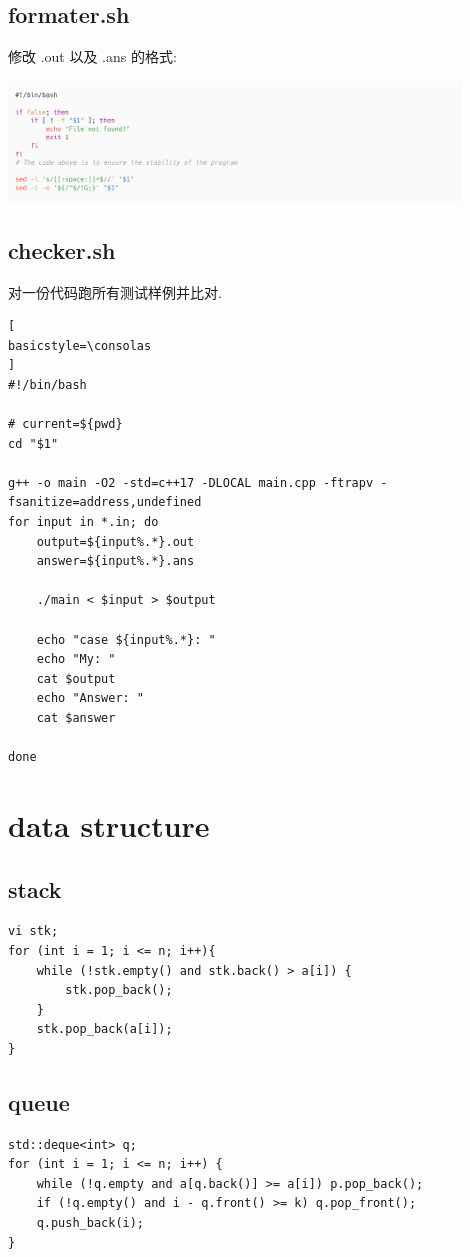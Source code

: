\documentclass[UTF8, a4paper, titlepage, twoside]{ctexart}
\begin{document}
\subsection{ formater.sh }

修改 .out 以及 .ans 的格式:

\begin{center}
	\includegraphics[width=12cm]{graphs/formater.png}
\end{center}

\subsection{ checker.sh }
对一份代码跑所有测试样例并比对.

\begin{lstlisting}[
basicstyle=\consolas
]
#!/bin/bash

# current=${pwd}
cd "$1"

g++ -o main -O2 -std=c++17 -DLOCAL main.cpp -ftrapv -fsanitize=address,undefined
for input in *.in; do 
    output=${input%.*}.out
    answer=${input%.*}.ans
    
    ./main < $input > $output

    echo "case ${input%.*}: "
    echo "My: "
    cat $output
    echo "Answer: "
    cat $answer

done
\end{lstlisting}

\newpage
\section{ data structure }

\subsection{ stack }
\begin{lstlisting}[style=cpp]
vi stk;
for (int i = 1; i <= n; i++){
    while (!stk.empty() and stk.back() > a[i]) {
        stk.pop_back();
    }
    stk.pop_back(a[i]);
}
\end{lstlisting}

\subsection{ queue }
\begin{lstlisting}[style=cpp]
std::deque<int> q;
for (int i = 1; i <= n; i++) {    
    while (!q.empty and a[q.back()] >= a[i]) p.pop_back();
    if (!q.empty() and i - q.front() >= k) q.pop_front();
    q.push_back(i);
}
\end{lstlisting}
\end{document}
